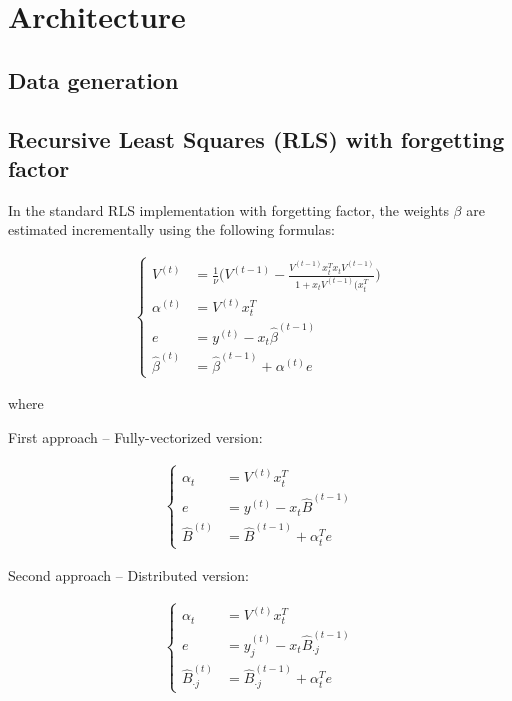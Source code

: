 \chapter{Architecture}


\section{Data generation}

  \begin{figure}[ht]
    \begin{center}
      \resizebox{.85\textwidth}{!}{
        
      }
    \end{center}
  \end{figure}


\section{Recursive Least Squares (RLS) with forgetting factor}

In the standard RLS implementation with forgetting factor,
the weights $\beta$ are estimated incrementally using the following formulas:

\begin{align}
\begin{cases}
    V^{(t)} & = \frac{1}{\nu} \Bigg( V^{(t-1)} - \frac{V^{(t-1)} x_t^T x_t V^{(t-1)}}{1 + x_t V^{(t-1)} (x_t^T} \Bigg) \\
    \alpha^{(t)} & = V^{(t)} x_t^T \\
    e & = y^{(t)} - x_t \hat{\beta}^{(t-1)} \\
    \hat{\beta}^{(t)} & = \hat{\beta}^{(t-1)} + \alpha^{(t)} e
\end{cases}
\end{align}

where 

First approach -- Fully-vectorized version:

\begin{align}
\begin{cases}
    \alpha_t & = V^{(t)} x_t^T \\
    e & = y^{(t)} - x_t \hat{B}^{(t-1)} \\
    \hat{B}^{(t)} & = \hat{B}^{(t-1)} + \alpha_t^T e
\end{cases}
\end{align}

Second approach -- Distributed version:

\begin{align}
\begin{cases}
    \alpha_t & = V^{(t)} x_t^T \\
    e & = y_j^{(t)} - x_t \hat{B}_{\cdot j}^{(t-1)} \\
    \hat{B}_{\cdot j}^{(t)} & = \hat{B}_{\cdot j}^{(t-1)} + \alpha_t^T e
\end{cases}
\end{align}


